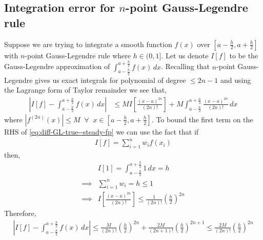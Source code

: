 \subsection{Integration error for $n$-point Gauss-Legendre rule}\label{ssec-error-GL--steady-fp}
Suppose we are trying to integrate a smooth function $f(x)$ over $\left[a-\frac{h}{2}, a+\frac{h}{2}\right]$ with $n$-point Gauss-Legendre rule where $h\in(0, 1]$. Let us denote $I[f]$ to be the Gauss-Legendre approximation of $\int_{a-\frac{h}{2}}^{a+\frac{h}{2}} f(x)\,dx$. Recalling that $n$-point Gauss-Legendre gives us exact integrals for polynomial of degree $\le 2n-1$ and using the Lagrange form of Taylor remainder we see that, 
\begin{align}
    \left|I[f]-\int_{a-\frac{h}{2}}^{a+\frac{h}{2}} f(x)\,dx\right| &\le MI\left[\frac{(x-a)^{2n}}{(2n)!}\right]+M\int_{a-\frac{h}{2}}^{a+\frac{h}{2}} \frac{(x-a)^{2n}}{(2n)!}\,dx\label{eq:diff-GL-true--steady-fp}
\end{align}
where $|f^{(2n)}(x)|\le M\;\;\forall\;\;x\in\left[a-\frac{h}{2}, a+\frac{h}{2}\right]$. To bound the first term on the RHS of \eqref{eq:diff-GL-true--steady-fp} we can use the fact that if 
\begin{align}
    I[f] = \sum_{i=1}^nw_if(x_i)
\end{align}
then,
\begin{align}
    &I[1] = \int_{a-\frac{h}{2}}^{a+\frac{h}{2}} 1 \,dx = h\\
    \implies&\sum_{i=1}^nw_i = h\le1\\
    \implies&I\left[\frac{(x-a)^{2n}}{(2n)!}\right]\le\frac{1}{(2n)!}\left(\frac{h}{2}\right)^{2n}
\end{align}
Therefore,
\begin{align}
    \left|I[f]-\int_{a-\frac{h}{2}}^{a+\frac{h}{2}} f(x)\,dx\right|\le \frac{M}{(2n)!}\left(\frac{h}{2}\right)^{2n}+\frac{2M}{(2n+1)!}\left(\frac{h}{2}\right)^{2n+1}\le\frac{2M}{(2n)!}\left(\frac{h}{2}\right)^{2n}
\end{align}
 